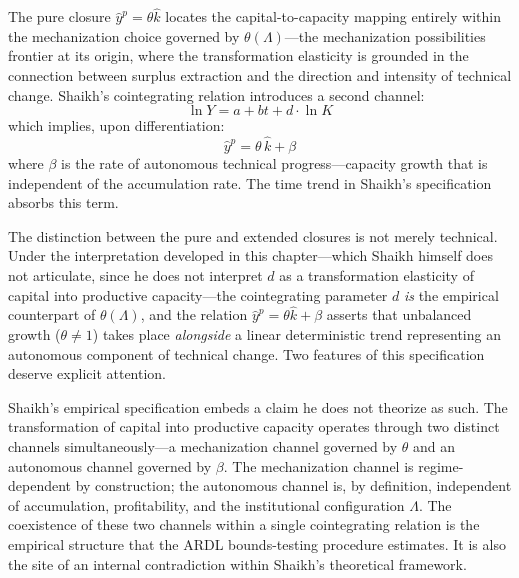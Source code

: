 The pure closure $\hat{y}^p = \theta\hat{k}$ locates the capital-to-capacity mapping entirely within the mechanization choice governed by $\theta(\Lambda)$---the mechanization possibilities frontier at its origin, where the transformation elasticity is grounded in the connection between surplus extraction and the direction and intensity of technical change. Shaikh's cointegrating relation introduces a second channel:
%
\begin{equation}\label{eq:shaikh_coint}
	\ln Y = a + bt + d \cdot \ln K
\end{equation}
%
which implies, upon differentiation:
%
\begin{equation}\label{eq:extended_closure}
	\hat{y}^p = \theta\,\hat{k} + \beta
\end{equation}
%
where $\beta$ is the rate of autonomous technical progress---capacity growth that is independent of the accumulation rate. The time trend in Shaikh's specification absorbs this term.

The distinction between the pure and extended closures is not merely technical. Under the interpretation developed in this chapter---which Shaikh himself does not articulate, since he does not interpret $d$ as a transformation elasticity of capital into productive capacity---the cointegrating parameter $d$ \emph{is} the empirical counterpart of $\theta(\Lambda)$, and the relation $\hat{y}^p = \theta\hat{k} + \beta$ asserts that unbalanced growth ($\theta \neq 1$) takes place \emph{alongside} a linear deterministic trend representing an autonomous component of technical change. Two features of this specification deserve explicit attention.

Shaikh's empirical specification embeds a claim he does not theorize as such. The transformation of capital into productive capacity operates through two distinct channels simultaneously---a mechanization channel governed by $\theta$ and an autonomous channel governed by $\beta$. The mechanization channel is regime-dependent by construction; the autonomous channel is, by definition, independent of accumulation, profitability, and the institutional configuration $\Lambda$. The coexistence of these two channels within a single cointegrating relation is the empirical structure that the ARDL bounds-testing procedure estimates. It is also the site of an internal contradiction within Shaikh's theoretical framework.

